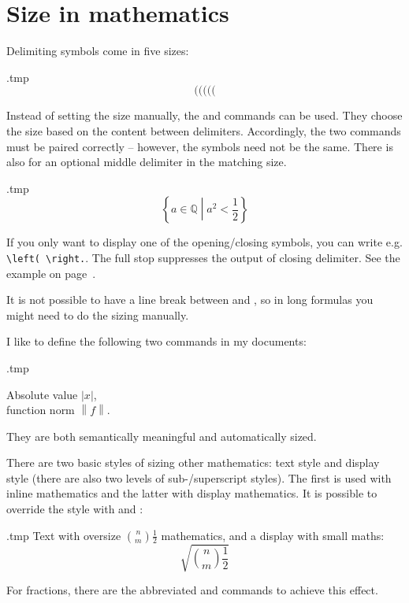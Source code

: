 %
%
%
\section{Size in mathematics}

Delimiting symbols come in five sizes:
\begin{VerbatimOut}{\jobname.tmp}
\[
( \big( \Big( \bigg( \Bigg(
\]
\end{VerbatimOut}
\ShowExample
%
Instead of setting the size manually,
the  and  commands can be used.
They choose the size based on the content between delimiters.
Accordingly, the two commands must be paired correctly
-- however, the symbols need not be the same.
There is also  for an optional middle delimiter in the matching size.
%
\begin{VerbatimOut}{\jobname.tmp}
\[
\left\{ a \in \mathbb Q
  \middle| a^2 < \frac 1 2 \right\}
\]
\end{VerbatimOut}
\ShowExample
%
If you only want to display one of the opening/closing symbols,
you can write e.g. \verb|\left( \right.|.
The full stop suppresses the output of closing delimiter.
See the example on page~\pageref{ex:math equations in cases}.

\begin{gotcha}
It is not possible to have a line break between  and ,
so in long formulas you might need to do the sizing manually.
\end{gotcha}

\begin{practices}
I like to define the following two commands in my documents:
%
\begin{VerbatimOut}{\jobname.tmp}
\newcommand{\abs}[1]{\left|#1\right|}
\newcommand{\norm}[1]{\left\|#1\right\|}

Absolute value $\abs x$,\\
function norm $\norm f$.
\end{VerbatimOut}
\ShowExample
%
They are both semantically meaningful and automatically sized.
\end{practices}

There are two basic styles of sizing other mathematics: text style and display style
(there are also two levels of sub-/superscript styles).
The first is used with inline mathematics and the latter with display mathematics.
It is possible to override the style with  and :
%
\begin{VerbatimOut}{\jobname.tmp}
Text with oversize
$\displaystyle \binom n m \frac 1 2$
mathematics, and a display with small maths:
\[
\sqrt{\textstyle \binom n m \frac 1 2}
\]
\end{VerbatimOut}
\ShowExample
%
For fractions, there are the abbreviated  and  commands
to achieve this effect.


